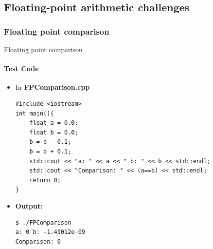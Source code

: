 \documentclass[9pt,pdftex]{beamer}
\begin{document}
\subsection{Floating-point arithmetic challenges}
\subsubsection{Floating point comparison}
\begin{frame}[fragile]{Floating point comparison}
\framesubtitle{Test Code}
\begin{itemize}
\item[] In \textbf{FPComparison.cpp}
\scriptsize{
\begin{lstlisting} 
#include <iostream>
int main(){
    float a = 0.0;
    float b = 0.0;
    b = b - 0.1;
    b = b + 0.1;
    std::cout << "a: " << a << " b: " << b << std::endl;
    std::cout << "Comparison: " << (a==b) << std::endl;
    return 0;
}
\end{lstlisting}
}
\item[] \textbf{Output:}
\begin{lstlisting} 
$ ./FPComparison
a: 0 b: -1.49012e-09
Comparison: 0
\end{lstlisting}
\end{itemize}
\end{frame}
\end{document}
